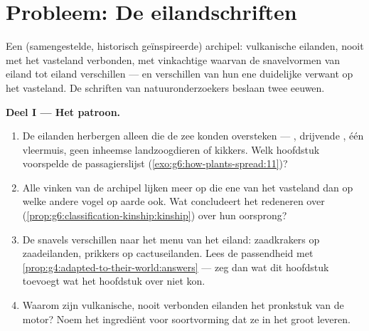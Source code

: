 \section{Probleem: De eilandschriften}

\begin{problem}\label{pb:g9:how-species-change:1}
Een (samengestelde, historisch geïnspireerde) archipel: vulkanische
eilanden, nooit met het vasteland verbonden, met vinkachtige 
waarvan de snavelvormen van eiland tot eiland verschillen --- en
verschillen van hun ene duidelijke verwant op het vasteland. De
schriften van natuuronderzoekers beslaan twee eeuwen.

\medskip\noindent\textbf{Deel I --- Het patroon.}
\begin{enumerate}
  \item De eilanden herbergen alleen  die de zee konden
        oversteken --- , drijvende , één vleermuis,
        geen inheemse landzoogdieren of kikkers. Welk hoofdstuk
        voorspelde de passagierslijst
        (\cref{exo:g6:how-plants-spread:11})?
  \item Alle vinken van de archipel lijken meer op die ene 
        van het vasteland dan op welke andere vogel op aarde ook.
        Wat concludeert het redeneren over 
        (\cref{prop:g6:classification-kinship:kinship}) over hun
        oorsprong?
  \item De snavels verschillen naar het menu van het eiland:
        zaadkrakers op zaadeilanden, prikkers op cactuseilanden.
        Lees de passendheid met
        \cref{prop:g4:adapted-to-their-world:answers} --- zeg dan
        wat dit hoofdstuk toevoegt wat het hoofdstuk over
         niet kon.
  \item Waarom zijn vulkanische, nooit verbonden eilanden het
        pronkstuk van de motor? Noem het ingrediënt voor
        soortvorming dat ze in het groot leveren.
\end{enumerate}


\end{problem}

